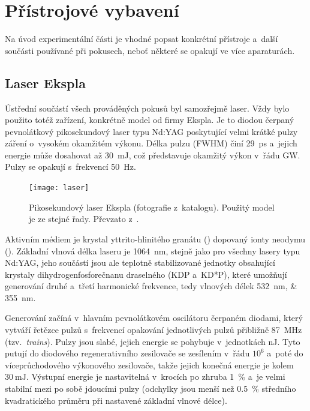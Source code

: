 \chapter{Přístrojové vybavení}
\label{sec:instruments}
Na úvod experimentální části je vhodné popsat konkrétní přístroje
a~další součásti používané při pokusech,
neboť některé se opakují ve více aparaturách.

\section{Laser Ekspla }
\label{sec:instruments-laser}
Ústřední součástí všech prováděných pokusů byl samozřejmě laser.
Vždy bylo použito totéž zařízení, konkrétně model 
od firmy Ekspla.
Je to diodou čerpaný pevnolátkový pikosekundový laser typu Nd:YAG
poskytující velmi krátké pulzy záření o~vysokém okamžitém výkonu.
Délka pulzu (FWHM) činí \SI{29}{\pico\second}
a~jejich energie může dosahovat až \SI{30}{\milli\joule},
což představuje okamžitý výkon v~řádu \si{\giga\watt}.
Pulzy se opakují s~frekvencí \SI{50}{\hertz}.

\begin{figure}[htp]
	\centering
	\texttt{[image: laser]}
	\caption{Pikosekundový laser Ekspla (fotografie z~katalogu).
		Použitý model je ze stejné řady.
		Převzato z~\cite{ekspla-datasheet}.}
	\label{fig:instruments-laser}
\end{figure}

Aktivním médiem je krystal yttrito-hlinitého granátu ()
dopovaný ionty neodymu ().\autocite{wiki-ndyag}
Základní vlnová délka laseru je \SI{1064}{\nano\metre},
stejně jako pro všechny lasery typu Nd:YAG,
jeho součástí jsou ale teplotně stabilizované jednotky obsahující
krystaly di\-hydro\-gen\-fosfo\-rečnanu draselného (KDP a~KD*P),
které umožňují generování druhé a~třetí harmonické frekvence,
tedy vlnových délek \SIlist{532; 355}{\nano\metre}.
\autocite{ekspla-datasheet}

Generování začíná v~hlavním pevnolátkovém oscilátoru čerpaném diodami,
který vytváří řetězce pulzů s~frekvencí opakování jednotlivých pulzů
přibližně \SI{87}{\mega\hertz} (tzv.~\emph{trains}).
Pulzy jsou slabé, jejich energie se pohybuje v~jednotkách \si{\nano\joule}.
Tyto putují do diodového regenerativního zesilovače se zesílením v~řádu $10^6$
a~poté do víceprůchodového výkonového zesilovače,
takže jejich konečná energie je kolem $\SI{30}{\milli\joule}$.
Výstupní energie je nastavitelná v~krocích po zhruba \SI{1}{\percent}
a~je velmi stabilní mezi po sobě jdoucími pulzy
(odchylky jsou menší než \SI{0.5}{\percent} středního kvadratického průměru
při nastavené základní vlnové délce).
\autocite{ekspla-datasheet}

